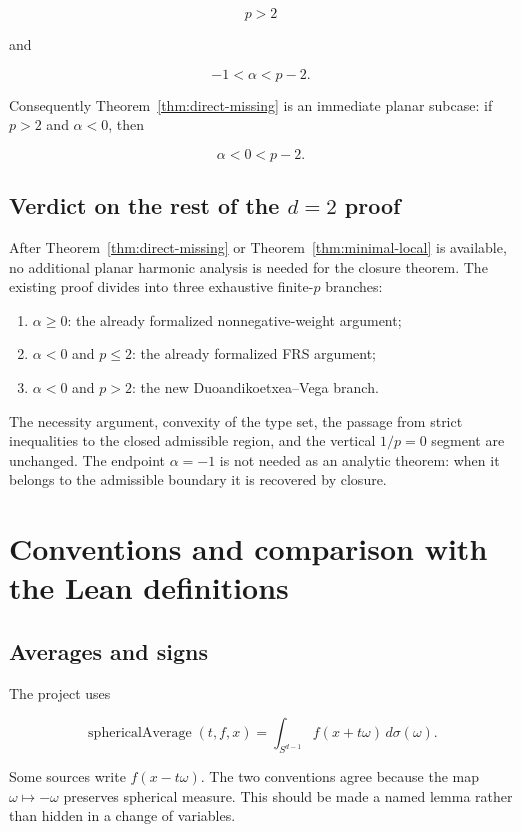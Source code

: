 \documentclass[11pt,a4paper]{article}
\theoremstyle{definition}
\theoremstyle{remark}
\begin{document}
\[
p>2
\]

and

\[
-1<\alpha<p-2.
\]

Consequently Theorem~\ref{thm:direct-missing} is an immediate planar subcase:
if $p>2$ and $\alpha<0$, then

\[
\alpha<0<p-2.
\]

\subsection{Verdict on the rest of the $d=2$ proof}

After Theorem~\ref{thm:direct-missing} or
Theorem~\ref{thm:minimal-local} is available, no additional planar harmonic
analysis is needed for the closure theorem.  The existing proof divides into
three exhaustive finite-$p$ branches:

\begin{enumerate}[leftmargin=8mm]
\item $\alpha\geq0$: the already formalized nonnegative-weight argument;
\item $\alpha<0$ and $p\leq2$: the already formalized FRS argument;
\item $\alpha<0$ and $p>2$: the new Duoandikoetxea--Vega branch.
\end{enumerate}

The necessity argument, convexity of the type set, the passage from strict
inequalities to the closed admissible region, and the vertical $1/p=0$ segment
are unchanged.  The endpoint $\alpha=-1$ is not needed as an analytic theorem:
when it belongs to the admissible boundary it is recovered by closure.

\section{Conventions and comparison with the Lean definitions}

\subsection{Averages and signs}

The project uses

\[
\operatorname{sphericalAverage}(t,f,x)
=
\int_{S^{d-1}} f(x+t\omega)\,d\sigma(\omega).
\]

Some sources write $f(x-t\omega)$.  The two conventions agree because the map
$\omega\mapsto-\omega$ preserves spherical measure.  This should be made a
named lemma rather than hidden in a change of variables.
\end{document}
